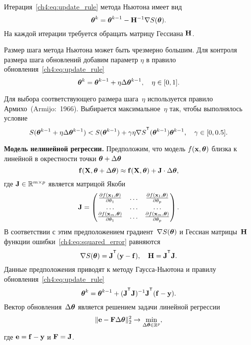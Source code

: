 \documentclass[11pt, a5paper]{dissert}
\begin{document}
Итерация~\eqref{ch4:eq:update_rule} метода Ньютона имеет вид
\[
	\boldsymbol{\theta}^k = \boldsymbol{\theta}^{k-1} - \mathbf{H}^{-1} \nabla S(\boldsymbol{\theta}).
\]
На каждой итерации требуется обращать матрицу Гессиана $\mathbf{H}$.

Размер шага метода Ньютона может быть чрезмерно большим. Для контроля размера шага обновлений добавим параметр $\eta$ в правило обновления~\eqref{ch4:eq:update_rule}
\[
	\boldsymbol{\theta}^k = \boldsymbol{\theta}^{k - 1} + \eta \Delta \boldsymbol{\theta}^{k - 1}, \quad \eta \in [0, 1].
\]

Для выбора соответствующего размера шага~$\eta$ используется правило Армихо~(Armijo:~1966). Выбирается максимальное~$\eta$ так, чтобы выполнялось условие
\[
	S(\btheta^{k - 1} + \eta \Delta \btheta^{k - 1}) < S(\btheta^{k - 1}) + \gamma \eta \nabla S^{\T}(\btheta^{k-1})\btheta^{k - 1}, \quad \gamma \in [0, 0.5].
\]

\textbf{Модель нелинейной регрессии.}
Предположим, что модель $f (\mathbf{x} , \boldsymbol{\theta})$ близка к линейной в окрестности точки $\boldsymbol{\theta} + \Delta \boldsymbol{\theta}$
\[
	\mathbf{f}(\mathbf{X} , \boldsymbol{\theta} + \Delta \boldsymbol{\theta}) \approx \mathbf{f}(\mathbf{X} , \boldsymbol{\theta}) + \mathbf{J} \cdot \Delta  \boldsymbol{\theta},
\]
где $\mathbf{J} \in \mathbb{R}^{m \times p}$ является матрицой Якоби
\begin{equation*}
	\mathbf{J} = 
	\begin{pmatrix}
		\frac{\partial f(\mathbf{x}_1 , \boldsymbol{\theta})}{\partial \theta_1} & \dots & 
		\frac{\partial f(\mathbf{x}_1 , \boldsymbol{\theta})}{\partial \theta_p} \\
		\dots & \dots & \dots \\
		\frac{\partial f(\mathbf{x}_m , \boldsymbol{\theta})}{\partial \theta_1} & \dots & 
		\frac{\partial f(\mathbf{x}_m , \boldsymbol{\theta})}{\partial \theta_p}
	\end{pmatrix}.
\end{equation*}
В соответствии с этим предположением градиент~$\nabla S(\boldsymbol{\theta})$ и Гессиан матрицы~$\mathbf{H}$ функции ошибки~\eqref{ch4:eq:squared_error} равняются
\begin{equation}
	\nabla S(\btheta) = \bJ^{\T} (\by - \mathbf{f}), \quad \bH = \bJ^{\T} \bJ.
	\label{ch4:eq:nonlin_reg_deriv}
\end{equation}
Данные предположения приводят к методу Гаусса-Ньютона и правилу обновления~\eqref{ch4:eq:update_rule}
\[
	\btheta^k = \btheta^{k - 1} + (\bJ^{\T} \bJ)^{-1}\bJ^{\T}(\mathbf{f} - \by).
\]
Вектор обновления~$\Delta \boldsymbol{\theta}$ является решением задачи линейной регрессии
\begin{equation}
	\| \mathbf{e} - \mathbf{F} \Delta \boldsymbol{\theta} \|_2^2 \rightarrow \min_{\Delta \boldsymbol{\theta} \in \mathbb{R}^{p}},
	\label{ch4:eq:lin_reg_nonlin_reg}
\end{equation}
где $\mathbf{e} = \mathbf{f} - \mathbf{y}$ и $\mathbf{F} = \mathbf{J}$.
\end{document}
